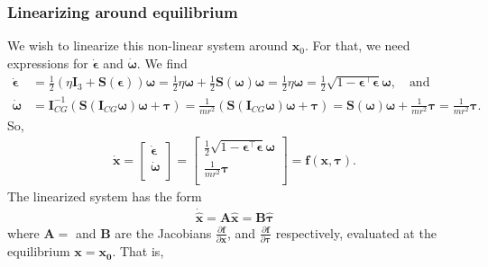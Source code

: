 \subsubsection{Linearizing around equilibrium}
We wish to linearize this non-linear system around $\mathbf{x}_0$. For that, we need expressions for $\dot{\boldsymbol{\epsilon}}$ and $\dot{\boldsymbol{\omega}}$. We find
\begin{align}
\dot{\boldsymbol{\epsilon}}
&= \frac{1}{2}(\eta \mathbf{I}_3 + \mathbf{S}(\boldsymbol{\epsilon}))\boldsymbol{\omega}
= \frac{1}{2}\eta \boldsymbol{\omega} + \frac{1}{2}\mathbf{S}(\boldsymbol{\omega})\boldsymbol{\omega}
= \frac{1}{2}\eta \boldsymbol{\omega}
= \frac{1}{2}\sqrt{1 - \boldsymbol{\epsilon}^\top\boldsymbol{\epsilon}}\boldsymbol{\omega}, \quad \text{and} \\
\dot{\boldsymbol{\omega}}
&= \mathbf{I}_{CG}^{-1}(\mathbf{S}(\mathbf{I}_{CG}\boldsymbol{\omega})\boldsymbol{\omega} + \boldsymbol{\tau})
=\frac{1}{mr^2}(\mathbf{S}(\mathbf{I}_{CG}\boldsymbol{\omega})\boldsymbol{\omega} + \boldsymbol{\tau})
= \boldsymbol{S}(\boldsymbol{\omega})\boldsymbol{\omega} + \frac{1}{mr^2}\boldsymbol{\tau}
= \frac{1}{mr^2}\boldsymbol{\tau}.
\end{align}
So,
\begin{equation}\begin{aligned}
\dot{\mathbf{x}} =
\begin{bmatrix}
\dot{\boldsymbol{\epsilon}}\\
\dot{\boldsymbol{\omega}}\\
\end{bmatrix}
=\begin{bmatrix}
\frac{1}{2}\sqrt{1-\boldsymbol{\epsilon}^\top\boldsymbol{\epsilon}}\boldsymbol{\omega}\\
\frac{1}{mr^2}\boldsymbol{\tau}\\
\end{bmatrix}
= \mathbf{f}(\mathbf{x}, \boldsymbol{\tau}).
\end{aligned}\end{equation}
The linearized system has the form
\begin{equation}\begin{aligned}
\dot{\hat{\mathbf{x}}} = \mathbf{A}\hat{\mathbf{x}} = \mathbf{B}\hat{\boldsymbol{\tau}}
\end{aligned}\end{equation}
where $\mathbf{A} = $ and $\mathbf{B}$ are the Jacobians $\frac{\partial \mathbf{f}}{\partial \mathbf{x}}$, and $\frac{\partial \mathbf{f}}{\partial \boldsymbol{\tau}}$ respectively, evaluated at the equilibrium $\mathbf{x}=\mathbf{x_0}$. That is,
